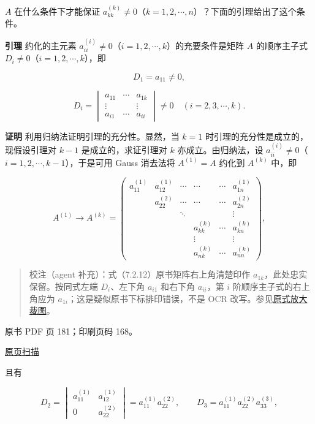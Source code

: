 \(A\) 在什么条件下才能保证 \(a_{kk}^{(k)}\ne0\)（\(k=1,2,\cdots,n\)）？下面的引理给出了这个条件。

\textbf{引理} 约化的主元素 \(a_{ii}^{(i)}\ne0\)（\(i=1,2,\cdots,k\)）的充要条件是矩阵 \(A\) 的顺序主子式 \(D_i\ne0\)（\(i=1,2,\cdots,k\)），即

\[D_1=a_{11}\ne0,\]

\[
D_i=\begin{vmatrix}
a_{11}&\cdots&a_{1k}\\
\vdots&&\vdots\\
a_{i1}&\cdots&a_{ii}
\end{vmatrix}\ne0\quad(i=2,3,\cdots,k).
\tag{7.2.12}
\]

\textbf{证明} 利用归纳法证明引理的充分性。显然，当 \(k=1\) 时引理的充分性是成立的，现假设引理对 \(k-1\) 是成立的，求证引理对 \(k\) 亦成立。由归纳法，设 \(a_{ii}^{(i)}\ne0\)（\(i=1,2,\cdots,k-1\)），于是可用 Gauss 消去法将 \(A^{(1)}=A\) 约化到 \(A^{(k)}\) 中，即

\[
A^{(1)}\to A^{(k)}=\begin{pmatrix}
a_{11}^{(1)}&a_{12}^{(1)}&\cdots&\cdots&\cdots&a_{1n}^{(1)}\\
&a_{22}^{(2)}&\cdots&\cdots&\cdots&a_{2n}^{(2)}\\
&&\ddots&&&\vdots\\
&&&a_{kk}^{(k)}&\cdots&a_{kn}^{(k)}\\
&&&\vdots&&\vdots\\
&&&a_{nk}^{(k)}&\cdots&a_{nn}^{(k)}
\end{pmatrix},
\]

\begin{quote}
校注（agent 补充）：式（7.2.12）原书矩阵右上角清楚印作 \(a_{1k}\)，此处忠实保留。按同式左端 \(D_i\)、左下角 \(a_{i1}\) 和右下角 \(a_{ii}\)，第 \(i\) 阶顺序主子式的右上角应为 \(a_{1i}\)；这是疑似原书下标排印错误，不是 OCR 改写。参见\href{verified/assets/ch07a/pdf-180-principal-minor-detail.png}{原式放大裁图}。
\end{quote}

\clearpage

原书 PDF 页 181；印刷页码 168。

\href{source-images/pdf-181.jpeg}{原页扫描}

且有

\[
D_2=\begin{vmatrix}a_{11}^{(1)}&a_{12}^{(1)}\\0&a_{22}^{(2)}\end{vmatrix}
=a_{11}^{(1)}a_{22}^{(2)},\qquad
D_3=a_{11}^{(1)}a_{22}^{(2)}a_{33}^{(3)},
\]

